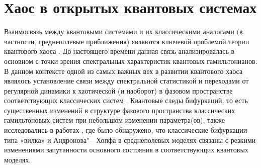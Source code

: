 \chapter{Хаос в открытых квантовых системах}\label{ch:ch3}

Взаимосвязь между квантовыми системами и их классическими аналогами (в частности, среднеполевые приближения) являются ключевой проблемой теории квантового хаоса \cite{Stockmann2006}. 
До настоящего времени данная связь анализировалась в основном с точки зрения спектральных характеристик квантовых гамильтонианов. 
В данном контексте одной из самых важных вех в развитии квантового хаоса являлось установление связи между спектральной статистикой и переходами от регулярной динамики к хаотической (и наоборот) в фазовом пространстве соответствующих классических систем \cite{Stockmann2006}. Квантовые следы бифуркаций, то есть существенных изменений в структуре фазового пространства классических гамильтоновых систем при небольшом изменении параметра(ов), также исследовались в работах \cite{Hines2005, Santos2006, Nemes2006}, где было обнаружено, что классические бифуркации типа «вилка» и Андронова"--~Хопфа \cite{Wiggins2013} в среднеполевых моделях связаны с резкими изменениями запутанности основного состояния в соответствующих квантовых моделях.


